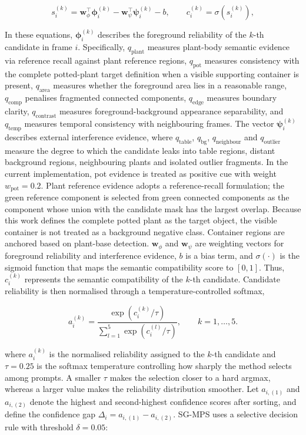 \documentclass[a4paper]{cas-sc}
\begin{document}
\[
s_i^{(k)}=\mathbf{w}_{\phi}^{\top}\boldsymbol{\phi}_i^{(k)}
-\mathbf{w}_{\psi}^{\top}\boldsymbol{\psi}_i^{(k)}-b,
\qquad c_i^{(k)}=\sigma\!\left(s_i^{(k)}\right),
\]

In these equations, \(\boldsymbol{\phi}_i^{(k)}\) describes the foreground reliability of the \(k\)-th candidate in frame \(i\). Specifically, \(q_{\text{plant}}\) measures plant-body semantic evidence via reference recall against plant reference regions, \(q_{\text{pot}}\) measures consistency with the complete potted-plant target definition when a visible supporting container is present, \(q_{\text{area}}\) measures whether the foreground area lies in a reasonable range, \(q_{\text{comp}}\) penalises fragmented connected components, \(q_{\text{edge}}\) measures boundary clarity, \(q_{\text{contrast}}\) measures foreground-background appearance separability, and \(q_{\text{temp}}\) measures temporal consistency with neighbouring frames. The vector \(\boldsymbol{\psi}_i^{(k)}\) describes external interference evidence, where \(q_{\text{table}}\), \(q_{\text{bg}}\), \(q_{\text{neighbour}}\) and \(q_{\text{outlier}}\) measure the degree to which the candidate leaks into table regions, distant background regions, neighbouring plants and isolated outlier fragments. In the current implementation, pot evidence is treated as positive cue with weight \(w_{\text{pot}}=0.2\). Plant reference evidence adopts a reference-recall formulation; the green reference component is selected from green connected components as the component whose union with the candidate mask has the largest overlap. Because this work defines the complete potted plant as the target object, the visible container is not treated as a background negative class. Container regions are anchored based on plant-base detection. \(\mathbf{w}_{\phi}\) and \(\mathbf{w}_{\psi}\) are weighting vectors for foreground reliability and interference evidence, \(b\) is a bias term, and \(\sigma(\cdot)\) is the sigmoid function that maps the semantic compatibility score to \([0,1]\). Thus, \(c_i^{(k)}\) represents the semantic compatibility of the \(k\)-th candidate. Candidate reliability is then normalised through a temperature-controlled softmax,

\[
a_i^{(k)}=\frac{\exp\left(c_i^{(k)}/\tau\right)}
{\sum_{l=1}^{5}\exp\left(c_i^{(l)}/\tau\right)},\qquad k=1,\ldots,5.
\]

where \(a_i^{(k)}\) is the normalised reliability assigned to the \(k\)-th candidate and \(\tau=0.25\) is the softmax temperature controlling how sharply the method selects among prompts. A smaller \(\tau\) makes the selection closer to a hard argmax, whereas a larger value makes the reliability distribution smoother. Let \(a_{i,(1)}\) and \(a_{i,(2)}\) denote the highest and second-highest confidence scores after sorting, and define the confidence gap \(\Delta_i=a_{i,(1)}-a_{i,(2)}\). SG-MPS uses a selective decision rule with threshold \(\delta=0.05\):
\end{document}
